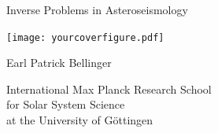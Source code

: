 \documentclass{article}
\begin{document}
\pagestyle{empty}

\null\vspace{-5cm}

\hspace*{-1.2cm}\colorbox{bcol}{\parbox[b][22cm][c]{15.2cm}{\null\hfill}}

\vspace{-19.4cm}

\hspace*{5mm}\begin{minipage}[t][17.5cm]{12cm}

\begin{center}

\fontsize{25}{30}\selectfont%

\textcolor{tcol}{Inverse Problems in Asteroseismology}%

\vspace{1.8cm}

\colorbox{fcol}{\parbox[b][64.4mm][c]{90.3mm}{\hspace{2mm}\texttt{[image: yourcoverfigure.pdf]}}}%

\vspace{1.5cm}

\textcolor{tcol}{Earl Patrick Bellinger}%

\vfill

\fontsize{12}{15}\selectfont%

\textcolor{scol}{International Max Planck Research School\\ for Solar System Science\\ at the University of G\"ottingen}

\end{center}

\end{minipage}
\end{document}

